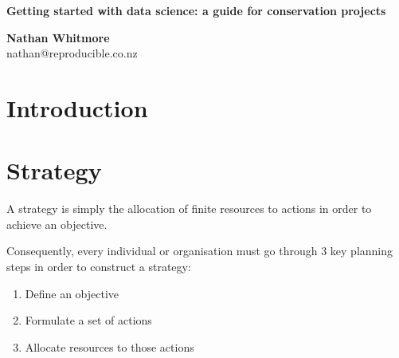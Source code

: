 \documentclass{article}
\begin{document}



\begin{titlepage}



\begin{center}
\vspace{20mm}


{\selectfont

    \textcolor{blue!20!black!30!green}{\Large\Huge{\textsf{\textbf{Getting started with data science: a guide for conservation projects}}}}
}



\end{center}

\vspace{80mm}

\begin{flushright}
\noindent\textbf{\textsf{Nathan Whitmore}}\\



\noindent \textsf{nathan@reproducible.co.nz}\\


\end{flushright}

\vspace{5mm}



\end{titlepage}


\section*{Introduction}


\section*{Strategy}

A strategy is simply the allocation of finite resources to actions in order to achieve an objective.

Consequently, every individual or organisation must go through 3 key planning steps in order to construct a strategy:

\begin{enumerate}
  \item Define an objective
  \item Formulate a set of actions
  \item Allocate resources to those actions
\end{enumerate}
\end{document}
